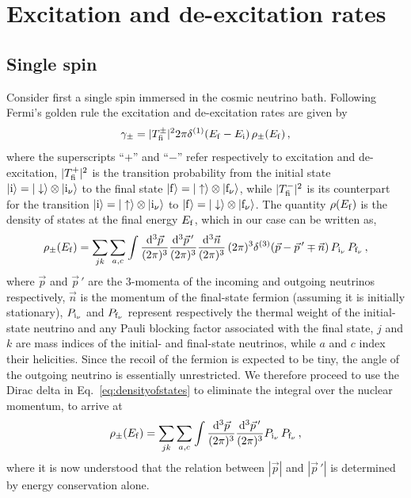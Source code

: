 \documentclass[aps,prd,10pt,twocolumn,superscriptaddress,floatfix,nofootinbib,amsmath,amssymb,altaffilletter,preprintnumbers]{revtex4-1}
\begin{document}

\section{Excitation and de-excitation rates}\label{app:rates}

\subsection{Single spin}

Consider first a single spin immersed in the cosmic neutrino bath.  Following Fermi's golden rule the excitation and de-excitation rates are given by 
\begin{equation}
\gamma_{\pm}=   |T^{\pm}_{\rm fi}|^2 
  2\pi\delta^{(1)}(E_{\rm f}-E_{\rm i}) \, \rho_\pm(E_{\rm f})\, ,
\label{eq:golden}
\end{equation}
where the superscripts ``$+$'' and ``$-$'' refer respectively to excitation and de-excitation, $|T^+_{\rm fi}|^2$ is the transition probability from the initial state $|{\rm i}\rangle = |\downarrow \rangle \otimes |{\rm i}_{\nu}\rangle$ to the final state $|{\rm f}\rangle= |\uparrow \rangle \otimes |{\rm f}_{\nu}\rangle$, while $|T^-_{\rm fi}|^2$ is its counterpart for the transition $|{\rm i}\rangle = |\uparrow \rangle \otimes |{\rm i}_{\nu}\rangle$ to $|{\rm f}\rangle= |\downarrow \rangle \otimes |{\rm f}_{\nu}\rangle$.  The quantity $\rho(E_{\rm f})$ is the density of states at the final energy $E_{\rm f}$, which in our case can be written as, 
\begin{equation}
\rho_\pm(E_{\rm f}) =  \sum_{jk} \sum_{a,c} \int \frac{{\rm d}^3\vec{p}}{(2 \pi)^3 }  \frac{{\rm d}^3 \vec{p}\,'}{(2 \pi)^3 } \frac{{\rm d}^3\vec{n}}{(2 \pi)^3 }   \, (2 \pi)^3 \delta^{(3)} ( \vec{p}-\vec{p}\,'\mp \vec{n})\, P_{{\rm i}_\nu} \, P_{{\rm f}_\nu}\,,
\label{eq:densityofstates}
\end{equation}
where $\vec{p}$ and $\vec{p}\,'$ are the 3-momenta of the incoming and outgoing neutrinos respectively, $\vec{n}$ is the momentum of the final-state fermion (assuming it is initially stationary),  $P_{{\rm i}_\nu}$ and $P_{{\rm f}_\nu}$ represent respectively the thermal weight of the initial-state neutrino and any Pauli blocking factor associated with the final state, $j$ and $k$ are mass indices of the initial- and final-state neutrinos, while $a$ and $c$ index their helicities.  
Since the recoil of the fermion is expected to be tiny, the angle of the outgoing neutrino is essentially unrestricted.  We therefore proceed to use the Dirac delta in Eq.~\eqref{eq:densityofstates} to eliminate the integral over the nuclear momentum, to arrive at
\begin{equation}
\rho_\pm(E_{\rm f}) =  \sum_{jk} \sum_{a,c} \int \frac{{\rm d}^3\vec{p}}{(2 \pi)^3 }  \frac{{\rm d}^3\vec{p}\,'}{(2 \pi)^3 }   P_{{\rm i}_\nu} \, P_{{\rm f}_\nu}\, ,
\label{eq:densityofstates2}
\end{equation}
where it is now understood that the relation between $|\vec{p}|$ and $|\vec{p}\,'|$ is determined by energy conservation alone.
\end{document}
